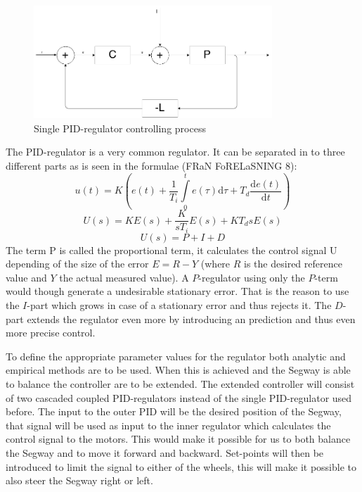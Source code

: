 \begin{figure}[h]
    \label{1}
    \centering
    \includegraphics[width=0.8\textwidth]{process_one_regul.png}
    \caption{Single PID-regulator controlling process}
\end{figure}
The PID-regulator is a very common regulator. It can be separated in to three different parts as is seen in the formulae (FRaN FoRELaSNING 8):
\begin{equation}
   u(t) = K(e(t) + \frac{1}{T_i}\int\limits_0^t e(\tau) \mathrm{d}\tau + T_d\frac{\mathrm d e(t)}{\mathrm d t})
\end{equation}
\begin{equation}
   U(s) = KE(s) +  \frac{K}{sT_i}E(s) + KT_d s E(s)
\end{equation}
\begin{equation}
   U(s) = P +  I + D
\end{equation}
The term P is called the proportional term, it calculates the control signal U depending of the size of the error $E = R - Y$ (where $R$ is the desired reference value and $Y$ the actual measured value). A $P$-regulator using only the $P$-term would though generate a undesirable stationary error. That is the reason to use the $I$-part which grows in case of a stationary error and thus rejects it. The $D$-part extends the regulator even more by introducing an prediction and thus even more precise control.

To define the appropriate parameter values for the regulator both analytic and empirical methods are to be used.
 When this is achieved and the Segway is able to balance the controller are to be extended. The extended controller will consist of  two cascaded coupled PID-regulators instead of the single PID-regulator used before. The input to the outer PID will be the desired position of the Segway, that signal will be used as input to the inner regulator which calculates the control signal to the motors. This would make it possible for us to both balance the Segway and to move it forward and backward. Set-points will then be introduced to limit the signal to either of the wheels, this will make it possible to also steer the Segway right or left.



